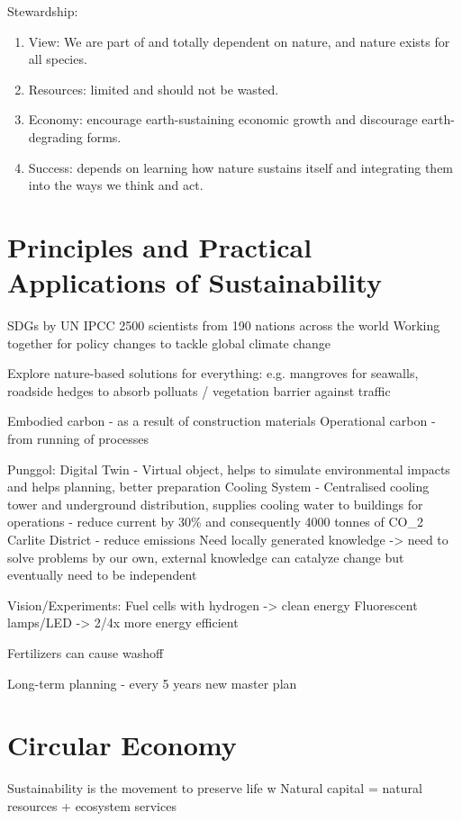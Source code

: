 \documentclass[12pt, a4paper]{article}
\begin{document}
\begin{multicols*}{3}
Stewardship:
\begin{enumerate}[\roman*.]
  \item View: We are part of and totally dependent on nature, and nature exists for all species. 
  \item Resources: limited and should not be wasted.
  \item Economy: encourage earth-sustaining economic growth and discourage earth-degrading forms.
  \item Success: depends on learning how nature sustains itself and integrating them into the ways we think and act.
\end{enumerate}
\colbreak
\section{Principles and Practical Applications of Sustainability}

SDGs by UN IPCC 2500 scientists from 190 nations across the world
Working together for policy changes to tackle global climate change

Explore nature-based solutions for everything: e.g. mangroves for seawalls, roadside hedges to absorb polluats / vegetation barrier against traffic 

Embodied carbon - as a result of construction materials
Operational carbon - from running of processes

Punggol:
Digital Twin - Virtual object, helps to simulate environmental impacts and helps planning, better preparation
Cooling System - Centralised cooling tower and underground distribution, supplies cooling water to buildings for operations - reduce current by 30\% and consequently 4000 tonnes of CO\_2
Carlite District - reduce emissions
Need locally generated knowledge -> need to solve problems by our own, external knowledge can catalyze change but eventually need to be independent

Vision/Experiments:
Fuel cells with hydrogen -> clean energy
Fluorescent lamps/LED -> 2/4x more energy efficient

Fertilizers can cause washoff


Long-term planning - every 5 years new master plan 

\section{Circular Economy}

Sustainability is the movement to preserve life w
Natural capital = natural resources + ecosystem services


\end{multicols*}
\end{document}
